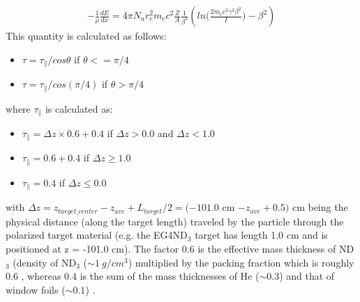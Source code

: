 \begin{eqnarray}
\label{eqBetheBlock}
-\frac{1}{\rho} \frac{dE}{dx} = 4\pi N_a r_e^2 m_e c^2 \frac{Z}{A} \frac{1}{\beta^2} \left( ln\bigg( \frac{2m_ec^2\gamma^2\beta^2}{I} \bigg) - \beta^2 \right) 
\end{eqnarray}
This quantity is calculated as follows:
\begin{itemize}
\item $\tau = \tau_{\parallel}/cos\theta$ \quad if $\theta <= \pi/4$
\item $\tau = \tau_{\parallel}/cos(\pi/4)$ \quad if $\theta > \pi/4$    %
\end{itemize}
where $\tau_{\parallel}$ is calculated as:
\begin{itemize}
\item $\tau_{\parallel} = \Delta z \times 0.6 + 0.4$ \quad if $\Delta z > 0.0 $ and $\Delta z < 1.0 $
\item $\tau_{\parallel} = 0.6 + 0.4$ \quad if $\Delta z \geq  1.0$
\item $\tau_{\parallel} = 0.4$ \quad if $\Delta z \leq  0.0$
\end{itemize}
with $\Delta z = z_{target\_center} - z_{ave} + L_{target}/2 = (-101.0$ cm $ - z_{ave} + 0.5)$ cm being the physical distance (along the target length) traveled by the particle through the polarized target material (e.g. the EG4ND$_3$ target has length 1.0 cm and is positioned at z = -101.0 cm). The factor 0.6 is the effective mass thickness of ND$_3$ (density of ND$_3$ ($\sim 1 ~g/cm^3$) %
multiplied by the packing fraction which is roughly 0.6 \cite{rferschAnaNote},%
whereas 0.4 is the sum of the mass thicknesses of He ($\sim 0.3$) and that of window foils ($\sim 0.1$) \cite{nGuler_th}. %


    
